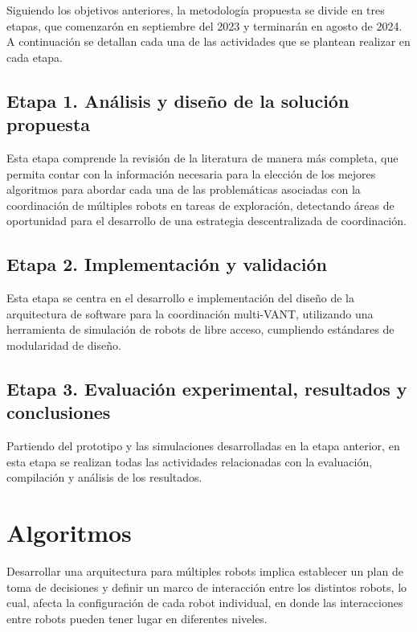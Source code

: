 \documentclass[sigconf]{acmart}
\begin{document}
Siguiendo los objetivos anteriores, la metodolog\'{i}a propuesta se divide en tres etapas, que comenzarón en septiembre del 2023 y terminarán en agosto de 2024. A continuaci\'{o}n se detallan cada una de las actividades que se plantean realizar en cada etapa.

\subsection*{Etapa 1. An\'{a}lisis y dise\~{n}o de la soluci\'{o}n propuesta}

Esta etapa comprende la revisi\'{o}n de la literatura de manera m\'{a}s completa, que permita contar con la informaci\'{o}n necesaria para la elecci\'{o}n de los mejores algoritmos para abordar cada una de las problem\'{a}ticas asociadas con la coordinaci\'{o}n de múltiples robots en tareas de exploración, detectando áreas de oportunidad para el desarrollo de una estrategia descentralizada de coordinación. 

\subsection*{Etapa 2. Implementaci\'{o}n y validaci\'{o}n}
  
  Esta etapa se centra en el desarrollo e implementaci\'{o}n del dise\~{n}o de la arquitectura de software para la coordinaci\'{o}n multi-VANT, utilizando una herramienta de simulación de robots de libre acceso, cumpliendo estándares de modularidad de diseño.
  
  \subsection*{Etapa 3. Evaluaci\'{o}n experimental, resultados y conclusiones}
  
  Partiendo del prototipo y las simulaciones desarrolladas en la etapa anterior, en esta etapa se realizan todas las actividades relacionadas con la evaluación, compilación y análisis de los resultados.
  
  
\section{Algoritmos}

Desarrollar una arquitectura para múltiples robots implica establecer un plan de toma de decisiones y definir un marco de interacción entre los distintos robots, lo cual, afecta la configuración de cada robot individual, en donde las interacciones entre robots pueden tener lugar en diferentes niveles.
\end{document}
